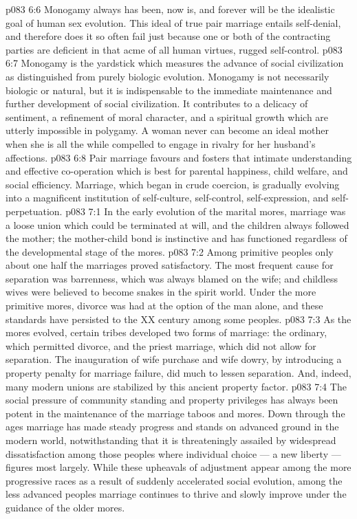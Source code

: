 \vs p083 6:6 \pc Monogamy always has been, now is, and forever will be the idealistic goal of human sex evolution. This ideal of true pair marriage entails self\hyp{}denial, and therefore does it so often fail just because one or both of the contracting parties are deficient in that acme of all human virtues, rugged self\hyp{}control.
\vs p083 6:7 Monogamy is the yardstick which measures the advance of social civilization as distinguished from purely biologic evolution. Monogamy is not necessarily biologic or natural, but it is indispensable to the immediate maintenance and further development of social civilization. It contributes to a delicacy of sentiment, a refinement of moral character, and a spiritual growth which are utterly impossible in polygamy. A woman never can become an ideal mother when she is all the while compelled to engage in rivalry for her husband’s affections.
\vs p083 6:8 Pair marriage favours and fosters that intimate understanding and effective co\hyp{}operation which is best for parental happiness, child welfare, and social efficiency. Marriage, which began in crude coercion, is gradually evolving into a magnificent institution of self\hyp{}culture, self\hyp{}control, self\hyp{}expression, and self\hyp{}perpetuation.
\vs p083 7:1 In the early evolution of the marital mores, marriage was a loose union which could be terminated at will, and the children always followed the mother; the mother\hyp{}child bond is instinctive and has functioned regardless of the developmental stage of the mores.
\vs p083 7:2 Among primitive peoples only about one half the marriages proved satisfactory. The most frequent cause for separation was barrenness, which was always blamed on the wife; and childless wives were believed to become snakes in the spirit world. Under the more primitive mores, divorce was had at the option of the man alone, and these standards have persisted to the XX century among some peoples.
\vs p083 7:3 As the mores evolved, certain tribes developed two forms of marriage: the ordinary, which permitted divorce, and the priest marriage, which did not allow for separation. The inauguration of wife purchase and wife dowry, by introducing a property penalty for marriage failure, did much to lessen separation. And, indeed, many modern unions are stabilized by this ancient property factor.
\vs p083 7:4 The social pressure of community standing and property privileges has always been potent in the maintenance of the marriage taboos and mores. Down through the ages marriage has made steady progress and stands on advanced ground in the modern world, notwithstanding that it is threateningly assailed by widespread dissatisfaction among those peoples where individual choice --- a new liberty --- figures most largely. While these upheavals of adjustment appear among the more progressive races as a result of suddenly accelerated social evolution, among the less advanced peoples marriage continues to thrive and slowly improve under the guidance of the older mores.
